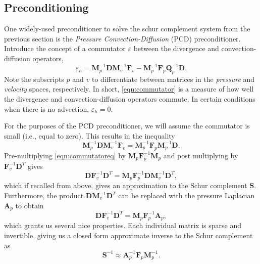 \documentclass{article}
\newcommand{\mat}[1]{\bm{{#1}}}
\begin{document}
\subsection{Preconditioning}
One widely-used preconditioner to solve the schur complement system from the previous section is the \textit{Pressure Convection-Diffusion} (PCD) preconditioner. Introduce the concept of a commutator $\varepsilon$ between the divergence and convection-diffusion operators,
\begin{equation}
  \varepsilon_h = \mat{M}_p^{-1}\mat{D}\mat{M}_v^{-1}\mat{F}_v - \mat{M}^{-1}_p\mat{F}_p\mat{Q}^{-1}_p\mat{D}. \label{eqn:commutator}
\end{equation}
Note the subscripts $p$ and $v$ to differentiate between matrices in the \textit{pressure} and \textit{velocity} spaces, respectively.
In short, \eqref{eqn:commutator} is a measure of how well the divergence and convection-diffusion operators commute.  In certain conditions when there is no advection, $\varepsilon_h=0$.

For the purposes of the PCD preconditioner, we will assume the commutator is small (i.e., equal to zero).  This results in the inequality
\begin{equation}
  \mat{M}_p^{-1}\mat{D}\mat{M}_v^{-1}\mat{F}_v = \mat{M}^{-1}_p\mat{F}_p\mat{M}^{-1}_p\mat{D}. \label{eqn:commutatoreq}
\end{equation}
Pre-multiplying \eqref{eqn:commutatoreq} by $\mat{M}_p\mat{F}^{-1}_p\mat{M}_p$ and post multiplying by $\mat{F}^{-1}_v\mat{D}^T$ gives
\begin{equation}
  \mat{D}\mat{F}_v^{-1}\mat{D}^T = \mat{M}_p\mat{F}_p^{-1}\mat{D}\mat{M}^{-1}_v\mat{D}^T, \label{eqn:commutatorschur}
\end{equation}
which if recalled from above, gives an approximation to the Schur complement $\mat{S}$.  Furthermore, the product $\mat{DM}_v^{-1}\mat{D}^T$ can be replaced with the pressure Laplacian $\mat{A}_p$ to obtain
\begin{equation}
  \mat{D}\mat{F}_v^{-1}\mat{D}^T = \mat{M}_p\mat{F}_p^{-1}\mat{A}_p, \label{eqn:schurlaplacian}
\end{equation}
which grants us several nice properties.  Each individual matrix is sparse and invertible, giving us a closed form approximate inverse to the Schur complement as
\begin{equation}
  \mat{S}^{-1} \approx \mat{A}_p^{-1} \mat{F}_p \mat{M}_p^{-1}. \label{eqn:schurclosed}
\end{equation}
\end{document}
